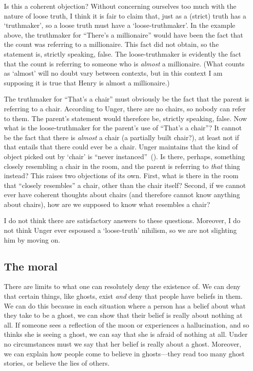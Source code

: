 \documentclass[11pt]{standalone} \newif\ifstandlone \standalonetrue
\begin{document}
\begin{spacing}{1.5}
Is this a coherent objection?  Without concerning ourselves too much
with the nature of loose truth, I think it is fair to claim that, just
as a (strict) truth has a `truthmaker', so a loose truth must have a
`loose-truthmaker'.  In the example above, the truthmaker for
``There's a millionaire'' would have been the fact that the count was
referring to a millionaire.  This fact did not obtain, so the
statement is, strictly speaking, false.  The loose-truthmaker is
evidently the fact that the count is referring to someone who is {\em
  almost} a millionaire.  (What counts as `almost' will no doubt vary
between contexts, but in this context I am supposing it is true that
Henry is almost a millionaire.)

The truthmaker for ``That's a chair'' must obviously be the fact that
the parent is referring to a chair.  According to Unger, there are no
chairs, so nobody can refer to them.  The parent's statement would
therefore be, strictly speaking, false.  Now what is the
loose-truthmaker for the parent's use of ``That's a chair''?  It cannot
be the fact that there is {\em almost} a chair (a partially built
chair?), at least not if that entails that there could ever be a
chair.  Unger maintains that the kind of object picked out by `chair'
is ``never instanced''~(\citeyear[147]{unger1979}).  Is there,
perhaps, something closely resembling a chair in the room, and the
parent is referring to {\em that} thing instead?  This raises two
objections of its own.  First, what is there in the room that
``closely resembles'' a chair, other than the chair itself?  Second, if
we cannot ever have coherent thoughts about chairs (and therefore
cannot know anything about chairs), how are we supposed to know what
resembles a chair?

I do not think there are satisfactory answers to these questions.
Moreover, I do not think Unger ever espoused a `loose-truth' nihilism,
so we are not slighting him by moving on.

\subsection{The moral}
\label{moral}
There are limits to what one can resolutely deny the existence of.  We
can deny that certain things, like ghosts, exist {\em and} deny that
people have beliefs in them.  We can do this because in each situation
where a person has a belief about what they take to be a ghost, we can
show that their belief is really about nothing at all.  If someone
sees a reflection of the moon or experiences a hallucination, and so
thinks she is seeing a ghost, we can say that she is afraid of nothing
at all.  Under no circumstances must we say that her belief is really
about a ghost.  Moreover, we can explain how people come to believe in
ghosts---they read too many ghost stories, or believe the lies of
others.


\end{spacing}
\end{document}
